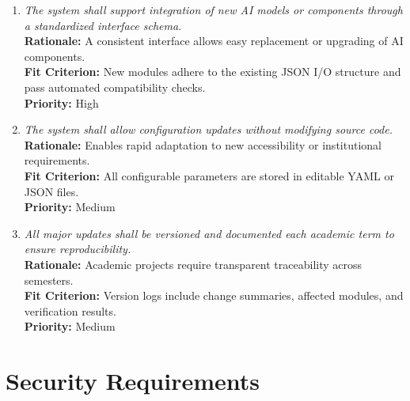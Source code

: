 \documentclass[12pt]{article}
\begin{document}
\begin{enumerate}[label=MS-AD\arabic*., wide=0pt, leftmargin=*]
  \item \emph{The system shall support integration of new AI models
    or components through a standardized interface schema.}\\[2mm]
    {\bf Rationale:} A consistent interface allows easy replacement
    or upgrading of AI components.\\
    {\bf Fit Criterion:} New modules adhere to the existing JSON I/O
    structure and pass automated compatibility checks.\\
    {\bf Priority:} High

  \item \emph{The system shall allow configuration updates without
    modifying source code.}\\[2mm]
    {\bf Rationale:} Enables rapid adaptation to new accessibility or
    institutional requirements.\\
    {\bf Fit Criterion:} All configurable parameters are stored in
    editable YAML or JSON files.\\
    {\bf Priority:} Medium

  \item \emph{All major updates shall be versioned and documented
    each academic term to ensure reproducibility.}\\[2mm]
    {\bf Rationale:} Academic projects require transparent
    traceability across semesters.\\
    {\bf Fit Criterion:} Version logs include change summaries,
    affected modules, and verification results.\\
    {\bf Priority:} Medium
\end{enumerate}

\section{Security Requirements}
\end{document}
